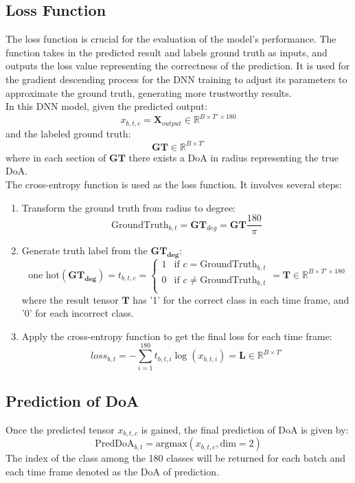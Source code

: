 \subsection*{Loss Function}
The loss function is crucial for the evaluation of the model's performance. The function takes in the predicted result and labels ground truth as inputs, and outputs the loss value representing the correctness of the prediction. It is used for the gradient descending process for the DNN training to adjust its parameters to approximate the ground truth, generating more trustworthy results.\\
In this DNN model, given the predicted output:
\[
    x_{b,t,c} = \mathbf{X}_{output} \in \mathbb{R}^{B \times T' \times 180} 
\]
and the labeled ground truth:
\[
    \mathbf{GT} \in \mathbb{R}^{B \times T'}
\]
where in each section of \(\mathbf{GT}\) there exists a DoA in radius representing the true DoA.\\
The cross-entropy function is used as the loss function. It involves several steps:
\begin{enumerate}
    \item Transform the ground truth from radius to degree:
    \[
        \text{GroundTruth}_{b,t} = \mathbf{GT}_{deg} = \mathbf{GT} \frac{180}{\pi}
    \]
    \item Generate truth label from the \(\mathbf{GT_{deg}}\):
    \[
        \text{one hot}(\mathbf{GT_{deg}}) = t_{b,t,c} = 
        \begin{cases}
        1 & \text{if } c = \text{GroundTruth}_{b,t}\\
        0 & \text{if } c \neq \text{GroundTruth}_{b,t}\\
        \end{cases}
        =\mathbf{T} \in \mathbb{R}^{B \times T' \times 180}
    \]
    where the result tensor \(\mathbf{T}\) has '1' for the correct class in each time frame, and '0' for each incorrect class.
    \item Apply the cross-entropy function to get the final loss for each time frame:
    \[
        loss_{b,t} = -\sum_{i = 1}^{180} t_{b,t,i} \log (x_{b,t,i}) = \mathbf{L} \in \mathbb{R}^{B \times T'}
    \]
\end{enumerate}


\subsection*{Prediction of DoA}
Once the predicted tensor \(x_{b,t,c}\) is gained, the final prediction of DoA is given by:
\[
    \text{PredDoA}_{b,t} = \text{argmax}(x_{b,t,c}, \text{dim} = 2)
\]
The index of the class among the 180 classes will be returned for each batch and each time frame denoted as the DoA of prediction.\\



